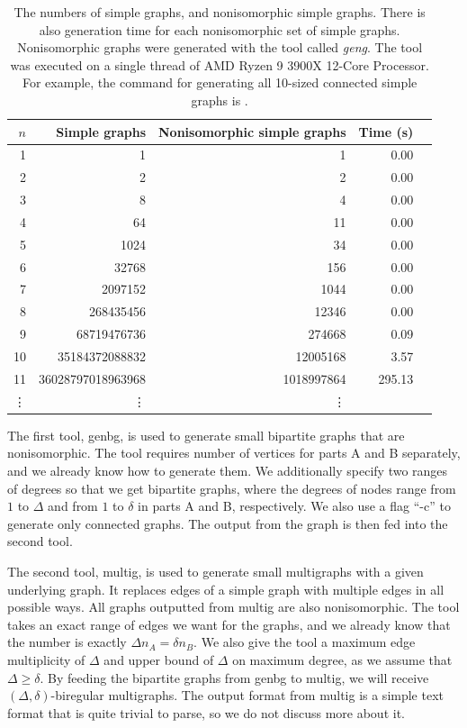 \begin{table}[H]
  \centering
  \begin{tabular}{r|r|rrr}
    \toprule
    $n$&Simple graphs & Nonisomorphic simple graphs & Time (s)\\
    \midrule
    1  &1                 & 1 & 0.00\\
    2  &2                 & 2 & 0.00\\
    3  &8                 & 4 & 0.00\\
    4  &64                & 11 & 0.00\\
    5  &1024              & 34 & 0.00\\
    6  &32768             & 156 & 0.00\\
    7  &2097152           & 1044 & 0.00\\
    8  &268435456         & 12346 & 0.00\\
    9  &68719476736       & 274668   & 0.09\\
    10 &35184372088832    & 12005168 & 3.57\\
    11 &36028797018963968 &1018997864&295.13\\
    \vdots & \vdots &\vdots\\
    \bottomrule
  \end{tabular}
  \caption{%
    The numbers of simple graphs, and nonisomorphic simple graphs.
    There is also generation time for each nonisomorphic set of simple graphs.
    Nonisomorphic graphs were generated with the tool called \emph{geng}.
    The tool was executed on a single thread of AMD Ryzen 9 3900X 12-Core Processor.
    For example, the command for generating all 10-sized connected simple graphs is .
  }
  \label{tbl:graph_count_nonisomorphic}
\end{table}

The first tool, genbg, is used to generate small bipartite graphs that are nonisomorphic.
The tool requires number of vertices for parts A and B separately, and we already know how to generate them.
We additionally specify two ranges of degrees so that we get bipartite graphs, where the degrees of nodes range from $1$ to $\Delta$ and from $1$ to $\delta$ in parts A and B, respectively.
We also use a flag ``-c'' to generate only connected graphs.
The output from the graph is then fed into the second tool.

The second tool, multig, is used to generate small multigraphs with a given underlying graph.
It replaces edges of a simple graph with multiple edges in all possible ways.
All graphs outputted from multig are also nonisomorphic.
The tool takes an exact range of edges we want for the graphs, and we already know that the number is exactly $\Delta n_A = \delta n_B$.
We also give the tool a maximum edge multiplicity of $\Delta$ and upper bound of $\Delta$ on maximum degree, as we assume that $\Delta \geq \delta$.
By feeding the bipartite graphs from genbg to multig, we will receive $(\Delta, \delta)$-biregular multigraphs.
The output format from multig is a simple text format that is quite trivial to parse, so we do not discuss more about it.

